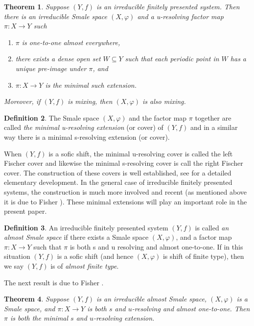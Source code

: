 \documentclass{amsart}
\theoremstyle{plain}
\newtheorem{theorem}{Theorem}[section]
\theoremstyle{definition}
\newtheorem{definition}[theorem]{Definition}
\theoremstyle{remark}
\begin{document}
\begin{theorem}{\cite[Theorem 1.1, Lemma 3.2]{fisher13}}\label{theorem:fp-factor-of-smale}
Suppose $(Y, f)$ is an irreducible finitely presented system.  Then there is an irreducible Smale space $(X,\varphi)$ and a u-resolving factor map $\pi:X \to Y$ such 
\begin{enumerate}
\item $\pi$ is one-to-one almost everywhere, 
\item there exists a dense open set $W \subseteq Y$ such that each periodic point in $W$ has a unique pre-image under $\pi$, and 
\item $\pi: X \rightarrow Y$ is the minimal such extension.
\end{enumerate}
Moreover, if $(Y, f)$ is mixing, then $(X, \varphi)$ is also mixing.
\end{theorem}
\begin{definition}
The Smale space $(X, \varphi)$ and the factor map $\pi$ together are called \emph{the minimal u-resolving extension} (or cover) of $(Y, f)$ and in a similar way there is a minimal s-resolving extension (or cover). 
\end{definition}
When $(Y, f)$ is a sofic shift, the minimal u-resolving cover is called the left Fischer cover and likewise the minimal s-resolving cover is call the right Fischer cover. The construction of these covers is well established, see \cite[Section 3.3]{lindmarcus} for a detailed elementary development. In the general case of irreducible finitely presented systems, the construction is much more involved and recent (as mentioned above it is due to Fisher \cite{fisher13}). These minimal extensions will play an important role in the present paper.

\begin{definition}
An irreducible finitely presented system $(Y, f)$ is called \emph{an almost Smale space} if there exists a Smale space $(X, \varphi)$, and a factor map $\pi : X \rightarrow Y$ such that $\pi$ is both s and u resolving and almost one-to-one. If in this situation $(Y, f)$ is a sofic shift (and hence $(X, \varphi)$ is shift of finite type), then we say $(Y, f)$ is of \emph{almost finite type}.
\end{definition}
The next result is due to Fisher \cite{fisher13}.
\begin{theorem}
Suppose $(Y, f)$ is an irreducible almost Smale space, $(X, \varphi)$ is a Smale space, and $\pi : X \rightarrow Y$ is both $s$ and $u$-resolving and almost one-to-one. Then $\pi$ is both the minimal $s$ and $u$-resolving extension.
\end{theorem}
\end{document}
